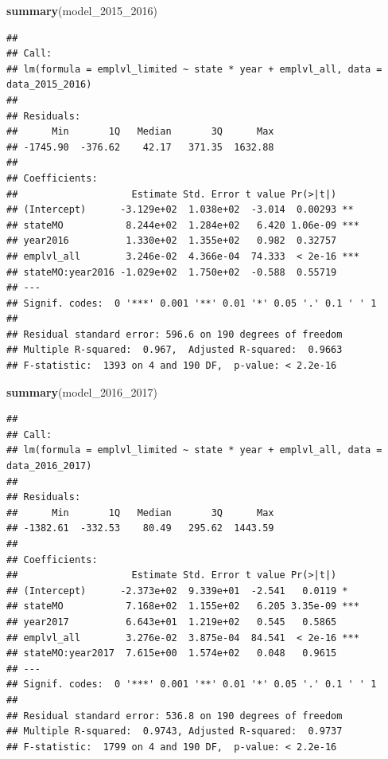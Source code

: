 \documentclass[
]{article}
\newenvironment{Shaded}{\begin{snugshade}}{\end{snugshade}}
\newcommand{\FunctionTok}[1]{\textcolor[rgb]{0.13,0.29,0.53}{\textbf{#1}}}
\newcommand{\NormalTok}[1]{#1}
\begin{document}
\begin{Shaded}
\begin{Highlighting}[]
\FunctionTok{summary}\NormalTok{(model\_2015\_2016)}
\end{Highlighting}
\end{Shaded}

\begin{verbatim}
## 
## Call:
## lm(formula = emplvl_limited ~ state * year + emplvl_all, data = data_2015_2016)
## 
## Residuals:
##      Min       1Q   Median       3Q      Max 
## -1745.90  -376.62    42.17   371.35  1632.88 
## 
## Coefficients:
##                    Estimate Std. Error t value Pr(>|t|)    
## (Intercept)      -3.129e+02  1.038e+02  -3.014  0.00293 ** 
## stateMO           8.244e+02  1.284e+02   6.420 1.06e-09 ***
## year2016          1.330e+02  1.355e+02   0.982  0.32757    
## emplvl_all        3.246e-02  4.366e-04  74.333  < 2e-16 ***
## stateMO:year2016 -1.029e+02  1.750e+02  -0.588  0.55719    
## ---
## Signif. codes:  0 '***' 0.001 '**' 0.01 '*' 0.05 '.' 0.1 ' ' 1
## 
## Residual standard error: 596.6 on 190 degrees of freedom
## Multiple R-squared:  0.967,  Adjusted R-squared:  0.9663 
## F-statistic:  1393 on 4 and 190 DF,  p-value: < 2.2e-16
\end{verbatim}

\begin{Shaded}
\begin{Highlighting}[]
\FunctionTok{summary}\NormalTok{(model\_2016\_2017)}
\end{Highlighting}
\end{Shaded}

\begin{verbatim}
## 
## Call:
## lm(formula = emplvl_limited ~ state * year + emplvl_all, data = data_2016_2017)
## 
## Residuals:
##      Min       1Q   Median       3Q      Max 
## -1382.61  -332.53    80.49   295.62  1443.59 
## 
## Coefficients:
##                    Estimate Std. Error t value Pr(>|t|)    
## (Intercept)      -2.373e+02  9.339e+01  -2.541   0.0119 *  
## stateMO           7.168e+02  1.155e+02   6.205 3.35e-09 ***
## year2017          6.643e+01  1.219e+02   0.545   0.5865    
## emplvl_all        3.276e-02  3.875e-04  84.541  < 2e-16 ***
## stateMO:year2017  7.615e+00  1.574e+02   0.048   0.9615    
## ---
## Signif. codes:  0 '***' 0.001 '**' 0.01 '*' 0.05 '.' 0.1 ' ' 1
## 
## Residual standard error: 536.8 on 190 degrees of freedom
## Multiple R-squared:  0.9743, Adjusted R-squared:  0.9737 
## F-statistic:  1799 on 4 and 190 DF,  p-value: < 2.2e-16
\end{verbatim}
\end{document}
